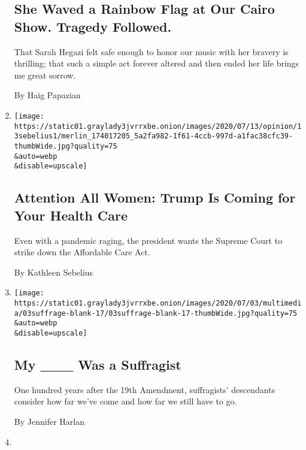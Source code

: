 \begin{enumerate}
  \hypertarget{she-waved-a-rainbow-flag-at-our-cairo-show-tragedy-followed}{%
  \subsection{She Waved a Rainbow Flag at Our Cairo Show. Tragedy
  Followed.}\label{she-waved-a-rainbow-flag-at-our-cairo-show-tragedy-followed}}

  That Sarah Hegazi felt safe enough to honor our music with her bravery
  is thrilling; that such a simple act forever altered and then ended
  her life brings me great sorrow.

  By Haig Papazian
\item
  \href{/2020/07/13/opinion/obamacare-aca-trump-women.html}{}

  \texttt{[image: https://static01.graylady3jvrrxbe.onion/images/2020/07/13/opinion/13sebelius1/merlin\_174017205\_5a2fa982-1f61-4ccb-997d-a1fac38cfc39-thumbWide.jpg?quality=75\\\&auto=webp\\\&disable=upscale]}

  \hypertarget{attention-all-women-trump-is-coming-for-your-health-care}{%
  \subsection{Attention All Women: Trump Is Coming for Your Health
  Care}\label{attention-all-women-trump-is-coming-for-your-health-care}}

  Even with a pandemic raging, the president wants the Supreme Court to
  strike down the Affordable Care Act.

  By Kathleen Sebelius
\item
  \href{/2020/07/02/style/woman-suffrage-movement-descend.html}{}

  \texttt{[image: https://static01.graylady3jvrrxbe.onion/images/2020/07/03/multimedia/03suffrage-blank-17/03suffrage-blank-17-thumbWide.jpg?quality=75\\\&auto=webp\\\&disable=upscale]}

  \hypertarget{my-___-was-a-suffragist}{%
  \subsection{My \_\_\_ Was a
  Suffragist}\label{my-___-was-a-suffragist}}

  One hundred years after the 19th Amendment, suffragists' descendants
  consider how far we've come and how far we still have to go.

  By Jennifer Harlan
\item
  \href{/2020/06/25/arts/nonbinary-comedians-pride-coronavirus.html}{}


\end{enumerate}

